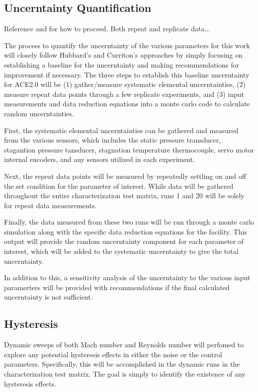 \subsection{Uncerntainty Quantification}

Reference \cite{stephens-hubbard} and \cite{curriston} for how to proceed. Both repeat and replicate data...

The process to quantify the uncerntainty of the various parameters for this work will closely follow Hubbard's and Curriton's approaches by simply focusing on establishing a baseline for the uncerntainty and making recommendations for improvement if necessary. The three steps to establish this baseline uncerntainty for ACE2.0 will be (1) gather/measure systematic elemental uncerntainties, (2) measure repeat data points through a few replicate experiments, and (3) input measurements and data reduction equations into a monte carlo code to calculate random uncerntainties.

First, the systematic elemental uncerntainties can be gathered and measured from the various sensors, which includes the static pressure transducer, stagantion pressure tansducer, stagnation temperature thermocouple, servo motor internal encoders, and any sensors utilized in each experiment. 

Next, the repeat data points will be measured by repeatedly settling on and off the set condition for the parameter of interest. While data will be gathered throughout the entire characterization test matrix, runs 1 and 20 will be solely for repeat data measurements. 

Finally, the data measured from these two runs will be run through a monte carlo simulation along with the specific data reduction equations for the facility. This output will provide the random uncerntainty component for each parameter of interest, which will be added to the systematic uncerntainty to give the total uncerntainty.

In addition to this, a sensitivity analysis of the uncerntainty to the various input paramerters will be provided with recommendations if the final calculated uncerntainty is not sufficient.

\subsection{Hysteresis}

Dynamic sweeps of both Mach number and Reynolds number will perfomed to explore any potential hysteresis effects in either the noise or the control parameters. Specifically, this will be accomplished in the dynamic runs in the characterization test matrix. The goal is simply to identify the existence of any hysteresis effects.

